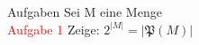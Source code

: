 \begin{frame}{Aufgaben}
	Sei M eine Menge\\
	\textcolor{red}{Aufgabe 1} Zeige: $2^{\lvert M\rvert} = \lvert\mathfrak{P}(M)\rvert$\\
\end{frame}
